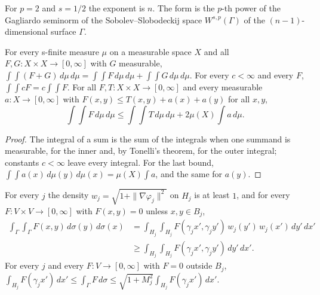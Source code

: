 For $p = 2$ and $s = 1/2$ the exponent is $n$. The form is the $p$-th power of the Gagliardo
seminorm of the Sobolev--Slobodeckij space $W^{s,p}(\Gamma)$ of the $(n-1)$-dimensional surface
$\Gamma$.

\begin{lemma}
\label{lem:double-integral-splitting}
\leanok
For every s-finite measure $\mu$ on a measurable space $X$ and all
$F, G \colon X \times X \to [0, \infty]$ with $G$ measurable,
$\int\!\int (F + G) \, d\mu \, d\mu
= \int\!\int F \, d\mu \, d\mu + \int\!\int G \, d\mu \, d\mu$. For every $c < \infty$ and
every $F$,
$\int\!\int c F = c \int\!\int F$. For all $F, T \colon X \times X \to [0, \infty]$ and every
measurable $a \colon X \to [0, \infty]$ with $F(x, y) \leq T(x, y) + a(x) + a(y)$ for all
$x, y$,
\[
  \int\!\int F \, d\mu \, d\mu \leq \int\!\int T \, d\mu \, d\mu + 2 \mu(X) \int a \, d\mu .
\]
\end{lemma}

\begin{proof}
\leanok
The integral of a sum is the sum of the integrals when one summand is measurable, for the inner
and, by Tonelli's theorem, for the outer integral; constants $c < \infty$ leave every integral.
For the last bound, $\int\!\int a(x) \, d\mu(y) \, d\mu(x) = \mu(X) \int a$, and the same for
$a(y)$.
\end{proof}

\begin{lemma}
\label{lem:boundary-double-integral-charts}
\leanok
{}
For every $j$ the density $w_j = \sqrt{1 + \|\nabla \varphi_j\|^2}$ on $H_j$ is at least $1$,
and for every $F \colon V \times V \to [0, \infty]$ with $F(x, y) = 0$ unless $x, y \in B_j$,
\begin{align*}
  \int_\Gamma \int_\Gamma F(x, y) \, d\sigma(y) \, d\sigma(x)
  &= \int_{H_j} \int_{H_j} F(\gamma_j x', \gamma_j y') \, w_j(y') \, w_j(x') \, dy' \, dx' \\
  &\geq \int_{H_j} \int_{H_j} F(\gamma_j x', \gamma_j y') \, dy' \, dx' .
\end{align*}
For every $j$ and every $F \colon V \to [0, \infty]$ with $F = 0$ outside $B_j$,
$\int_{H_j} F(\gamma_j x') \, dx' \leq \int_\Gamma F \, d\sigma
\leq \sqrt{1 + M_j^2} \int_{H_j} F(\gamma_j x') \, dx'$.
\end{lemma}

